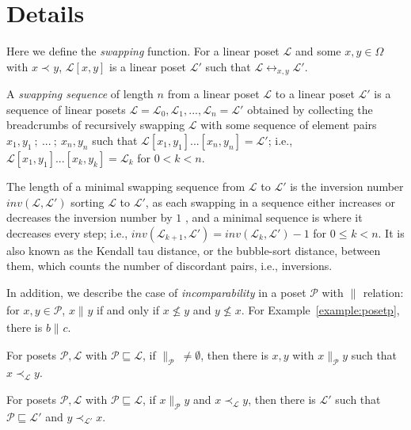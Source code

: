 \documentclass{llncs}
\let\oldleq\leq
\renewcommand{\leq}[1][]{\oldleq_{#1}}
\newcommand{\poset}[1]{\mathcal{#1}}
\newcommand{\uni}[1][]{\Omega_{#1}}
\newcommand{\swap}[1][]{\leftrightarrow_{#1}}
\newcommand{\lext}{\sqsubseteq}
\newcommand{\incomp}[1][]{\parallel_{#1}}
\newcommand{\covered}[1][]{\prec_{#1}}
\newcommand{\swapfn}[2]{#1[#2]}
\newcommand{\inv}[2]{inv(#1,#2)}
\begin{document}
\appendix
\renewcommand{\thesection}{\appendixname}
\section{Details}
\label{appendix:connected-proof}
Here we define the \emph{swapping} function. For a linear poset $\poset{L}$ and some $x,y \!\in\! \uni$ with $x \covered y$, $\swapfn{\poset{L}}{x,y}$ is a linear poset $\poset{L}'$ such that $\poset{L} \swap[x,y] \poset{L}'$.

A \emph{swapping sequence} of length $n$ from a linear poset $\poset{L}$ to a linear poset $\poset{L}'$ is a sequence of linear posets $\poset{L} = \poset{L}_0, \poset{L}_1, ... , \poset{L}_n = \poset{L}'$ obtained by collecting the breadcrumbs of recursively swapping $\poset{L}$ with some sequence of element pairs $x_1,y_1 \ ;\  ... \ ;\  x_n,y_n$ such that $\swapfn{\poset{L}}{x_1,y_1} ... [x_n,y_n] = \poset{L}'$; i.e., $\swapfn{\poset{L}}{x_1,y_1} ... [x_k,y_k] = \poset{L}_k$ for $0 < k < n$.

The length of a minimal swapping sequence from $\poset{L}$ to $\poset{L}'$ is the inversion number $\inv{\poset{L}}{\poset{L}'}$ sorting $\poset{L}$ to $\poset{L}'$, as each swapping in a sequence either increases or decreases the inversion number by $1$ \cite{ruskey1992generating}, and a minimal sequence is where it decreases every step; i.e., $\inv{\poset{L}_{k+1}}{\poset{L}'} = \inv{\poset{L}_k}{\poset{L}'} - 1$ for $0 \leq k < n$. It is also known as the Kendall tau distance, or the bubble-sort distance, between them, which counts the number of discordant pairs, i.e., inversions.

In addition, we describe the case of \emph{incomparability} in a poset $\poset{P}$ with $\incomp$ relation: for $x, y \!\in\! \poset{P}$, $x \incomp y$ if and only if $x \nleq y$ and $y \nleq x$. For Example~\ref{example:posetp}, there is $b \incomp c$.

\begin{lemma}
    For posets $\poset{P},\poset{L}$ with $\poset{P} \lext \poset{L}$, if $\incomp[\poset{P}]\> \neq \emptyset$, then there is $x,y$ with $x \incomp[\poset{P}] y$ such that $x \covered[\poset{L}] y$.
\end{lemma}

\begin{lemma}
    For posets $\poset{P},\poset{L}$ with $\poset{P} \lext \poset{L}$, if $x \incomp[\poset{P}] y$ and $x \covered[\poset{L}] y$, then there is $\poset{L}'$ such that $\poset{P} \lext \poset{L}'$ and $y \covered[\poset{L}'] x$.
\end{lemma}
\end{document}
